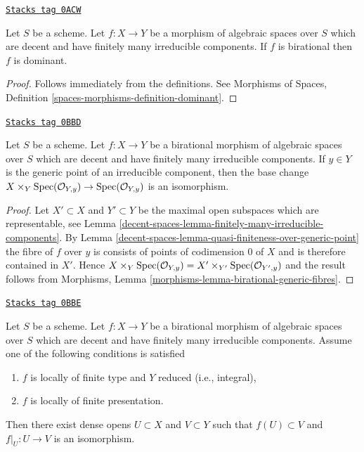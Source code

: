 \begin{lemma}
\label{decent-spaces-lemma-birational-dominant}
\href{https://stacks.math.columbia.edu/tag/0ACW}{\texttt{Stacks tag 0ACW}}

Let $S$ be a scheme.
Let $f : X \to Y$ be a morphism of algebraic spaces over $S$ which
are decent and have finitely many irreducible components. If $f$ is
birational then $f$ is dominant.
\end{lemma}

\begin{proof}
Follows immediately from the definitions. See
Morphisms of Spaces, Definition \ref{spaces-morphisms-definition-dominant}.
\end{proof}

\begin{lemma}
\label{decent-spaces-lemma-birational-generic-fibres}
\href{https://stacks.math.columbia.edu/tag/0BBD}{\texttt{Stacks tag 0BBD}}

Let $S$ be a scheme. Let $f : X \to Y$ be a birational morphism of
algebraic spaces over $S$ which are decent and have finitely
many irreducible components. If $y \in Y$ is the generic point of
an irreducible component, then the base change
$X \times_Y \operatorname{Spec}(\mathcal{O}_{Y, y}) \to \operatorname{Spec}(\mathcal{O}_{Y, y})$
is an isomorphism.
\end{lemma}

\begin{proof}
Let $X' \subset X$ and $Y' \subset Y$ be the maximal open subspaces
which are representable, see
Lemma \ref{decent-spaces-lemma-finitely-many-irreducible-components}. By
Lemma \ref{decent-spaces-lemma-quasi-finiteness-over-generic-point}
the fibre of $f$ over $y$ is consists
of points of codimension $0$ of $X$ and is therefore contained
in $X'$. Hence $X \times_Y \operatorname{Spec}(\mathcal{O}_{Y, y}) =
X' \times_{Y'} \operatorname{Spec}(\mathcal{O}_{Y', y})$ and the result follows
from Morphisms, Lemma \ref{morphisms-lemma-birational-generic-fibres}.
\end{proof}

\begin{lemma}
\label{decent-spaces-lemma-birational-birational}
\href{https://stacks.math.columbia.edu/tag/0BBE}{\texttt{Stacks tag 0BBE}}

Let $S$ be a scheme. Let $f : X \to Y$ be a birational morphism of
algebraic spaces over $S$ which are decent and have finitely many
irreducible components. Assume one of the following conditions is satisfied
\begin{enumerate}
\item $f$ is locally of finite type and $Y$ reduced (i.e., integral),
\item $f$ is locally of finite presentation.
\end{enumerate}
Then there exist dense opens $U \subset X$ and $V \subset Y$
such that $f(U) \subset V$ and $f|_U : U \to V$ is an isomorphism.
\end{lemma}

